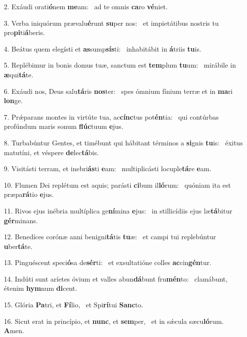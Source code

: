 2. Exáudi orati\textbf{ó}nem \textbf{me}am: \ast\  ad te omnis \textbf{ca}ro \textbf{vé}niet.\

3. Verba iniquórum prævalu\textbf{é}runt \textbf{su}per nos: \ast\  et impietátibus nostris tu pro\textbf{pi}ti\textbf{á}beris.\

4. Beátus quem elegísti et \textbf{as}sump\textbf{sís}ti: \ast\  inhabitábit in \textbf{á}triis \textbf{tu}is.\

5. Replébimur in bonis domus tuæ, sanctum est \textbf{tem}plum \textbf{tu}um: \ast\  mirábile in \textbf{æ}qui\textbf{tá}te.\

6. Exáudi nos, Deus salu\textbf{tá}ris \textbf{nos}ter: \ast\  spes ómnium fínium terræ et in \textbf{ma}ri \textbf{lon}ge.\

7. Prǽparans montes in virtúte tua, ac\textbf{cínc}tus pot\textbf{én}tia: \ast\  qui contúrbas profúndum maris sonum \textbf{flúc}tuum \textbf{e}jus.\

8. Turbabúntur Gentes, et timébunt qui hábitant términos a \textbf{si}gnis \textbf{tu}is: \ast\  éxitus matutíni, et véspere \textbf{de}lec\textbf{tá}bis.\

9. Visitásti terram, et inebri\textbf{ás}ti \textbf{e}am: \ast\  multiplicásti locuple\textbf{tá}re \textbf{e}am.\

10. Flumen Dei replétum est aquis; parásti \textbf{ci}bum il\textbf{ló}rum: \ast\  quóniam ita est præpa\textbf{rá}tio \textbf{e}jus.\

11. Rivos ejus inébria multíplica ge\textbf{ní}mina \textbf{e}jus: \ast\  in stillicídiis ejus læ\textbf{tá}bitur \textbf{gér}minans.\

12. Benedíces corónæ anni benigni\textbf{tá}tis \textbf{tu}æ: \ast\  et campi tui replebúntur \textbf{u}ber\textbf{tá}te.\

13. Pinguéscent speci\textbf{ó}sa de\textbf{sér}ti: \ast\  et exsultatióne colles \textbf{ac}cin\textbf{gén}tur.\

14. Indúti sunt aríetes óvium et valles abun\textbf{dá}bunt fru\textbf{mén}to: \ast\  clamábunt, étenim \textbf{hym}num \textbf{di}cent.\

15. Glória \textbf{Pa}tri, et \textbf{Fí}lio, \ast\  et Spi\textbf{rí}tui \textbf{Sanc}to.\

16. Sicut erat in princípio, et \textbf{nunc}, et \textbf{sem}per, \ast\  et in sǽcula sæcu\textbf{ló}rum. \textbf{A}men.\

